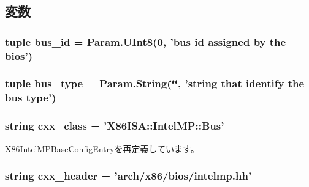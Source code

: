 \subsection{変数}
\hypertarget{classIntelMP_1_1X86IntelMPBus_a6e34d01145c4deea78b58e36f0a7e81b}{
\subsubsection[{bus\_\-id}]{\setlength{\rightskip}{0pt plus 5cm}tuple {\bf bus\_\-id} = Param.UInt8(0, 'bus id assigned by the bios')}}
\label{classIntelMP_1_1X86IntelMPBus_a6e34d01145c4deea78b58e36f0a7e81b}
\hypertarget{classIntelMP_1_1X86IntelMPBus_af3235df6397cf9b9f67ea06e6d675121}{
\subsubsection[{bus\_\-type}]{\setlength{\rightskip}{0pt plus 5cm}tuple {\bf bus\_\-type} = Param.String(\char`\"{}\char`\"{}, 'string that identify the bus {\bf type}')}}
\label{classIntelMP_1_1X86IntelMPBus_af3235df6397cf9b9f67ea06e6d675121}
\hypertarget{classIntelMP_1_1X86IntelMPBus_a58cd55cd4023648e138237cfc0822ae3}{
\subsubsection[{cxx\_\-class}]{\setlength{\rightskip}{0pt plus 5cm}string {\bf cxx\_\-class} = '{\bf X86ISA::IntelMP::Bus}'}}
\label{classIntelMP_1_1X86IntelMPBus_a58cd55cd4023648e138237cfc0822ae3}


\hyperlink{classIntelMP_1_1X86IntelMPBaseConfigEntry_a58cd55cd4023648e138237cfc0822ae3}{X86IntelMPBaseConfigEntry}を再定義しています。\hypertarget{classIntelMP_1_1X86IntelMPBus_a17da7064bc5c518791f0c891eff05fda}{
\subsubsection[{cxx\_\-header}]{\setlength{\rightskip}{0pt plus 5cm}string {\bf cxx\_\-header} = 'arch/x86/bios/intelmp.hh'}}
\label{classIntelMP_1_1X86IntelMPBus_a17da7064bc5c518791f0c891eff05fda}


